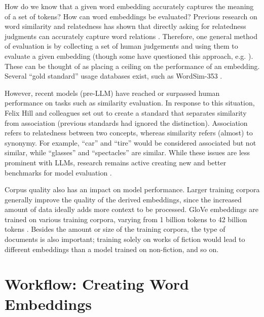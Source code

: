 How do we know that a given word embedding accurately captures the meaning of a set of tokens? How can word embeddings be evaluated? Previous research on word similarity and relatedness has shown that directly asking for relatedness judgments can accurately capture word relations \cite{finkelstein2001placing}. Therefore, one general method of evaluation is by collecting a set of human judgements and using them to evaluate a given embedding (though some have questioned this approach, e.g. \cite{richie2022inter}). These can be thought of as placing a ceiling on the performance of an embedding. Several ``gold standard'' usage databases exist, such as WordSim-353 \cite{finkelstein2001placing, agirre2009study}. 

However, recent models (pre-LLM) have reached or surpassed human performance on tasks such as similarity evaluation. In response to this situation, Felix Hill and colleagues \cite{hill2015simlex} set out to create a standard that separates similarity from association (previous standards had ignored the distinction). Association refers to relatedness between two concepts, whereas similarity refers (almost) to synonymy. For example, ``car'' and ``tire'' would be considered associated but not similar, while ``glasses'' and ``spectacles'' are similar. While these issues are less prominent with LLMs, research remains active creating new and better benchmarks for model evaluation \cite{bugliarello2023measuring}.

Corpus quality also has an impact on model performance. Larger training corpora generally improve the quality of the derived embeddings, since the increased amount of data ideally adds more context to be processed. GloVe embeddings are trained on various training corpora, varying from 1 billion tokens to 42 billion tokens \cite{pennington2014glove}. Besides the amount or size of the training corpora, the type of documents is also important; training solely on works of fiction would lead to different embeddings than a model trained on non-fiction, and so on.


\section{Workflow: Creating Word Embeddings}\label{createWordEmbeddings}

